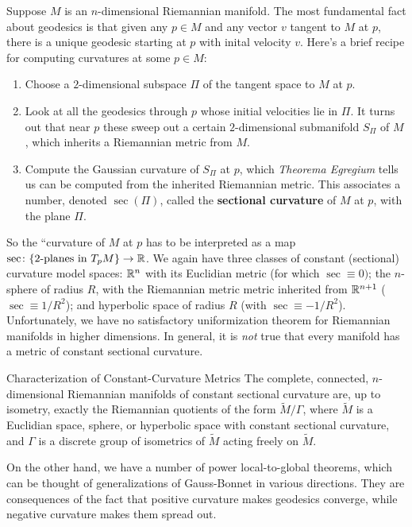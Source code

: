 Suppose $M$ is an $n$-dimensional Riemannian manifold. The most fundamental fact about geodesics is that given any $p \in M$ and any vector $v$ tangent to $M$ at $p$, there is a unique geodesic starting at $p$ with inital velocity $v$. Here's a brief recipe for computing curvatures at some $p \in M$:
\begin{enumerate}
    \item Choose a $2$-dimensional subspace $\Pi$ of the tangent space to $M$ at $p$.
    \item Look at all the geodesics through $p$ whose initial velocities lie in $\Pi$. It turns out that near $p$ these sweep out a certain $2$-dimensional submanifold $S_{\Pi}$ of $M$, which inherits a Riemannian metric from $M$.
    \item Compute the Gaussian curvature of $S_{\Pi}$ at $p$, which \emph{Theorema Egregium} tells us can be computed from the inherited Riemannian metric. This associates a number, denoted $\sec(\Pi)$, called the \textbf{sectional curvature} of $M$ at $p$, with the plane $\Pi$.
\end{enumerate}
So the ``curvature of $M$ at $p$ has to be interpreted as a map $\sec \colon \{2\text{-planes in} \ T_p M\}  \to \mathbb{R}$. We again have three classes of constant (sectional) curvature model spaces: $\mathbb{R}^n $ with its Euclidian metric (for which $\sec \equiv 0)$; the $n$-sphere of radius $R$, with the Riemannian metric metric inherited from $\mathbb{R}^{n+1}$ ($\sec \equiv 1 /R^2$); and hyperbolic space of radius $R$ (with $\sec \equiv -1 / R^2$). Unfortunately, we have no satisfactory uniformization theorem for Riemannian manifolds in higher dimensions. In general, it is \emph{not} true that every manifold has a metric of constant sectional curvature. 
\begin{namedthm}{Characterization of Constant-Curvature Metrics}
   The complete, connected, $n$-dimensional Riemannian manifolds of constant sectional curvature are, up to isometry, exactly the Riemannian quotients of the form $\widetilde M / \Gamma$, where $\widetilde M$ is a Euclidian space, sphere, or hyperbolic space with constant sectional curvature, and $\Gamma$ is a discrete group of isometrics of $\widetilde M$ acting freely on $\widetilde M$.
\end{namedthm}
On the other hand, we have a number of power local-to-global theorems, which can be thought of generalizations of Gauss-Bonnet in various directions. They are consequences of the fact that positive curvature makes geodesics converge, while negative curvature makes them spread out. 
